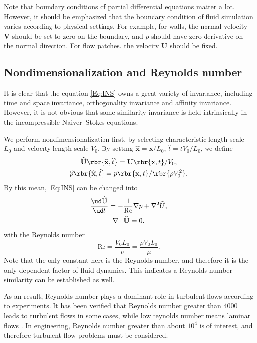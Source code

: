 \documentclass[english, nochinese]{pkupaper}
\begin{document}
Note that boundary conditions of partial differential equations matter a lot. However, it should be emphasized that the boundary condition of fluid simulation varies according to physical settings. For example, for walls, the normal velocity $\mathbf{V}$ should be set to zero on the boundary, and $p$ should have zero derivative on the normal direction. For flow patches, the velocity $\mathbf{U}$ should be fixed.

\subsection{Nondimensionalization and Reynolds number}

It is clear that the equation \eqref{Eq:INS} owns a great variety of invariance, including time and space invariance, orthogonality invariance and affinity invariance. However, it is not obvious that some similarity invariance is held intrinsically in the incompressible Naiver--Stokes equations.

We perform nondimensionalization first, by selecting characteristic length scale $L_0$ and velocity length scale $V_0$. By setting $ \widehat{\mathbf{x}} = \mathbf{x} / L_0 $, $ \widehat{t} = t V_0 / L_0 $, we define
\begin{gather}
\widehat{\mathbf{U}} \rbr{ \widehat{\mathbf{x}}, \widehat{t} } = \mathbf{U} \rbr{ \mathbf{x}, t } / V_0, \\
\widehat{p} \rbr{ \widehat{\mathbf{x}}, \widehat{t} } = p \rbr{ \mathbf{x}, t } / \rbr{ \rho V_0^2 }.
\end{gather}
By this mean, \eqref{Eq:INS} can be changed into
\begin{equation} \label{Eq:NDINS}
\begin{gathered}
\frac{ \ud \widehat{\mathbf{U}} }{ \ud t } = -\frac{1}{\mathrm{Re}} \nabla p + \nabla^2 \widehat{U}, \\
\nabla \cdot \widehat{\mathbf{U}} = 0.
\end{gathered}
\end{equation}
with the Reynolds number
\begin{equation}
\mathrm{Re} = \frac{ V_0 L_0 }{\nu} = \frac{ \rho V_0 L_0 }{\mu}.
\end{equation}
Note that the only constant here is the Reynolds number, and therefore it is the only dependent factor of fluid dynamics. This indicates a Reynolds number similarity can be established as well.

As an result, Reynolds number plays a dominant role in turbulent flows according to experiments. It has been verified that Reynolds number greater than 4000 leads to turbulent flows in some cases, while low reynolds number means laminar flows \parencite{holman_heat_1986}. In engineering, Reynolds number greater than about $10^4$ is of interest, and therefore turbulent flow problems must be considered.
\end{document}
